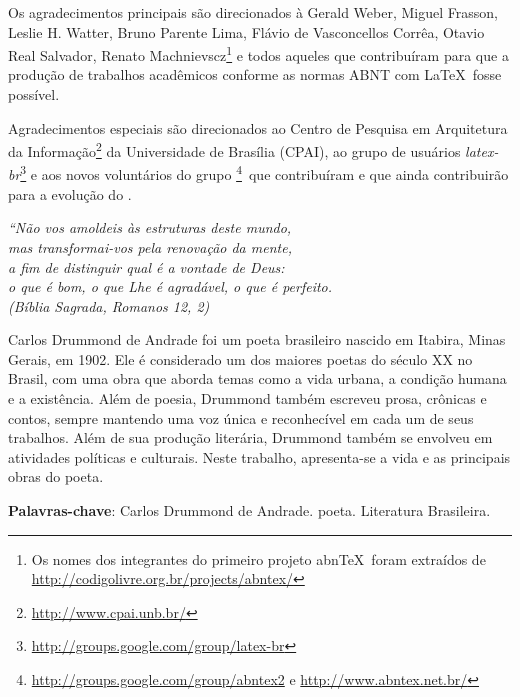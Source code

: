 \documentclass[12pt, openright,	oneside, a4paper, english, french, spanish, brazil]{abntex2}
\begin{document}
\begin{agradecimentos}
Os agradecimentos principais são direcionados à Gerald Weber, Miguel Frasson,
Leslie H. Watter, Bruno Parente Lima, Flávio de Vasconcellos Corrêa, Otavio Real
Salvador, Renato Machnievscz\footnote{Os nomes dos integrantes do primeiro
projeto abn\TeX\ foram extraídos de
\url{http://codigolivre.org.br/projects/abntex/}} e todos aqueles que
contribuíram para que a produção de trabalhos acadêmicos conforme
as normas ABNT com \LaTeX\ fosse possível.

Agradecimentos especiais são direcionados ao Centro de Pesquisa em Arquitetura
da Informação\footnote{\url{http://www.cpai.unb.br/}} da Universidade de
Brasília (CPAI), ao grupo de usuários
\emph{latex-br}\footnote{\url{http://groups.google.com/group/latex-br}} e aos
novos voluntários do grupo
\emph{\abnTeX}\footnote{\url{http://groups.google.com/group/abntex2} e
\url{http://www.abntex.net.br/}}~que contribuíram e que ainda
contribuirão para a evolução do \abnTeX.

\end{agradecimentos}

\begin{epigrafe}
    \vspace*{\fill}
	\begin{flushright}
		\textit{``Não vos amoldeis às estruturas deste mundo, \\
		mas transformai-vos pela renovação da mente, \\
		a fim de distinguir qual é a vontade de Deus: \\
		o que é bom, o que Lhe é agradável, o que é perfeito.\\
		(Bíblia Sagrada, Romanos 12, 2)}
	\end{flushright}
\end{epigrafe}


\setlength{\absparsep}{18pt} %
\begin{resumo}
 Carlos Drummond de Andrade foi um poeta brasileiro nascido em Itabira, Minas Gerais, em 1902. Ele é considerado um dos maiores poetas do século XX no Brasil, com uma obra que aborda temas como a vida urbana, a condição humana e a existência. Além de poesia, Drummond também escreveu prosa, crônicas e contos, sempre mantendo uma voz única e reconhecível em cada um de seus trabalhos.  Além de sua produção literária, Drummond também se envolveu em atividades políticas e culturais. Neste trabalho, apresenta-se a vida e as principais obras do poeta.
 
 \textbf{Palavras-chave}: Carlos Drummond de Andrade. poeta. Literatura Brasileira.
\end{resumo}
\end{document}
